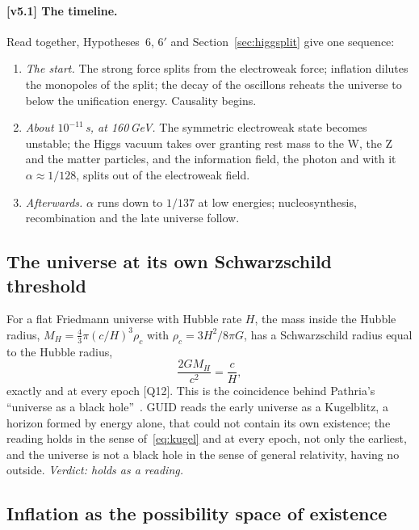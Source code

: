 \documentclass[11pt,a4paper]{article}
\theoremstyle{definition}
\theoremstyle{remark}
\newcommand{\chk}[1]{\textsf{[#1]}}
\newcommand{\vtag}{{\color{newc}\textsf{\scriptsize[v5.1]}}}
\newenvironment{vnew}{\color{newc}}{}
\theoremstyle{definition}
\begin{document}
\begin{vnew}
\paragraph{\vtag{} The timeline.} Read together, Hypotheses~6, 6$'$ and Section~\ref{sec:higgsplit} give one sequence:
\begin{enumerate}[nosep]
\item \emph{The start.} The strong force splits from the electroweak force; inflation dilutes the monopoles of the split; the decay of the
oscillons reheats the universe to below the unification energy. Causality begins.
\item \emph{About $10^{-11}$\,s, at 160\,GeV.} The symmetric electroweak state becomes unstable; the Higgs vacuum takes over granting rest
mass to the W, the Z and the matter particles, and the information field, the photon and with it $\alpha\approx1/128$, splits out of the
electroweak field.
\item \emph{Afterwards.} $\alpha$ runs down to $1/137$ at low energies; nucleosynthesis, recombination and the late universe follow.
\end{enumerate}
\end{vnew}


\subsection{The universe at its own Schwarzschild threshold}

For a flat Friedmann universe with Hubble rate $H$, the mass inside the Hubble radius, $M_H=\tfrac43\pi(c/H)^3\rho_c$ with
$\rho_c=3H^2/8\pi G$, has a Schwarzschild radius equal to the Hubble radius,
\begin{equation}\label{eq:kugel}
\frac{2GM_H}{c^2}=\frac cH ,
\end{equation}
exactly and at every epoch \chk{Q12}. This is the coincidence behind Pathria's ``universe as a black hole''~\cite{pathria}. GUID reads the
early universe as a Kugelblitz, a horizon formed by energy alone, that could not contain its own existence; the reading holds in the sense
of~\eqref{eq:kugel} and at every epoch, not only the earliest, and the universe is not a black hole in the sense of general relativity,
having no outside. \emph{Verdict: holds as a reading.}

\subsection{Inflation as the possibility space of existence}
\end{document}
